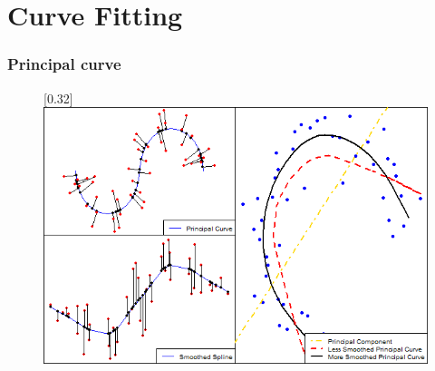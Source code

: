\documentclass[9 pt]{beamer}
\begin{document}
\section*{Curve Fitting}
\begin{frame}
\frametitle{Principal curve}
\begin{figure}[!th]
\centering
\begin{minipage}[b]{.45\linewidth}
\centering
{}
\end{minipage}
\begin{minipage}[b]{.45\linewidth}
\hspace{-.4cm}
\centering
\scalebox{0.25}[0.32]{\includegraphics{pics/plot4.png}}
\end{minipage}
\end{figure}
\end{frame}
\end{document}

